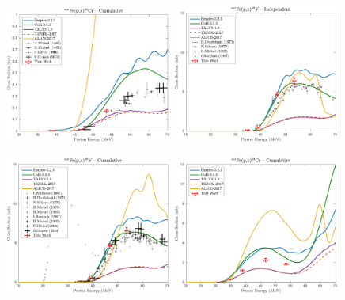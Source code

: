 \begin{figure}
 \centering
 \includegraphics[width=0.49\textwidth]{./figures/48Cr.pdf}
 \includegraphics[width=0.49\textwidth]{./figures/48V_ind.pdf}
 
 
 \includegraphics[width=0.49\textwidth]{./figures/48V_cum.pdf}
 \includegraphics[width=0.49\textwidth]{./figures/49Cr.pdf}
 

\end{figure}

